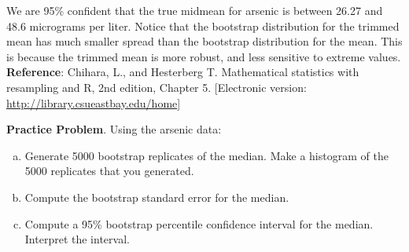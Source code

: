 \documentclass[fleqn, 12pt]{article}\usepackage[]{graphicx}\usepackage[]{color}
\begin{document}
We are 95\% confident that the true midmean for arsenic is between 26.27 and 48.6 micrograms per liter.  Notice that the bootstrap distribution for the trimmed mean has much smaller spread than the bootstrap distribution for the mean.  This is because the trimmed mean is more robust, and less sensitive to extreme values.\\

\textbf{Reference}:  Chihara, L., and Hesterberg T. Mathematical statistics with resampling and R, 2nd edition, Chapter 5. [Electronic version: \url{http://library.csueastbay.edu/home}]\\

\bigskip

\textbf{Practice Problem}. Using the arsenic data:
\begin{enumerate}[(a)]
\item Generate 5000 bootstrap replicates of the median.  Make a histogram of the 5000 replicates that you generated.
\item Compute the bootstrap standard error for the median.
\item Compute a 95\% bootstrap percentile confidence interval for the median.  Interpret the interval.
\end{enumerate}




\clearpage
\end{document}
